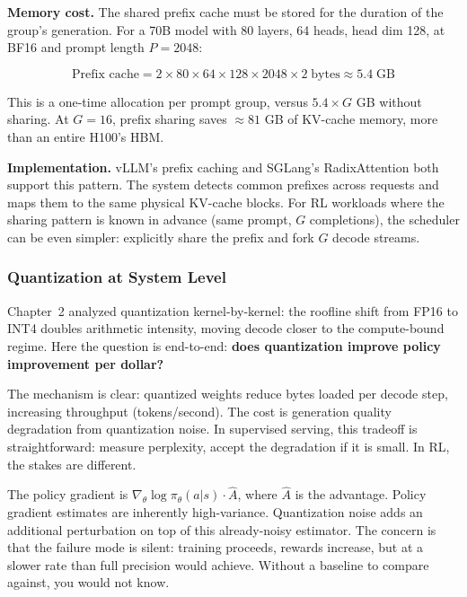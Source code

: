\textbf{Memory cost.} The shared prefix cache must be stored for the duration of the group's generation. For a 70B model with 80 layers, 64 heads, head dim 128, at BF16 and prompt length $P = 2048$:

$$\text{Prefix cache} = 2 \times 80 \times 64 \times 128 \times 2048 \times 2 \;\text{bytes} \approx 5.4 \;\text{GB}$$

This is a one-time allocation per prompt group, versus $5.4 \times G$ GB without sharing. At $G = 16$, prefix sharing saves $\approx 81$ GB of KV-cache memory, more than an entire H100's HBM.

\textbf{Implementation.} vLLM's prefix caching and SGLang's RadixAttention both support this pattern. The system detects common prefixes across requests and maps them to the same physical KV-cache blocks. For RL workloads where the sharing pattern is known in advance (same prompt, $G$ completions), the scheduler can be even simpler: explicitly share the prefix and fork $G$ decode streams.

\subsubsection*{Quantization at System Level}

Chapter~2 analyzed quantization kernel-by-kernel: the roofline shift from FP16 to INT4 doubles arithmetic intensity, moving decode closer to the compute-bound regime. Here the question is end-to-end: \textbf{does quantization improve policy improvement per dollar?}

The mechanism is clear: quantized weights reduce bytes loaded per decode step, increasing throughput (tokens/second). The cost is generation quality degradation from quantization noise. In supervised serving, this tradeoff is straightforward: measure perplexity, accept the degradation if it is small. In RL, the stakes are different.

The policy gradient is $\nabla_\theta \log \pi_\theta(a|s) \cdot \hat{A}$, where $\hat{A}$ is the advantage. Policy gradient estimates are inherently high-variance. Quantization noise adds an additional perturbation on top of this already-noisy estimator. The concern is that the failure mode is silent: training proceeds, rewards increase, but at a slower rate than full precision would achieve. Without a baseline to compare against, you would not know.

